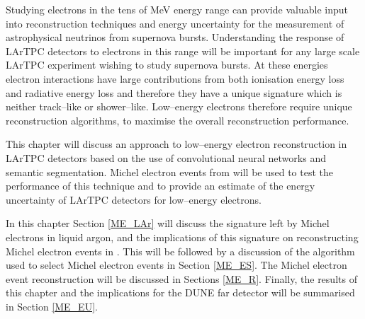 \minitoc

\noindent
Studying electrons in the tens of MeV energy range can provide valuable input 
into reconstruction techniques and energy uncertainty for the measurement of
astrophysical neutrinos from supernova bursts. Understanding the response of
LArTPC detectors to electrons in this range will be important for any large
scale LArTPC experiment wishing to study supernova bursts. At these energies
electron interactions have large contributions from both ionisation energy loss
and radiative energy loss and therefore they have a unique signature which is 
neither track--like or shower--like. Low--energy electrons therefore require 
unique reconstruction algorithms, to maximise the overall reconstruction 
performance. 

This chapter will discuss an approach to low--energy electron reconstruction 
in LArTPC detectors based on the use of convolutional neural networks and 
semantic segmentation. Michel electron events from \protodune{} will be used 
to test the performance of this technique and to provide an estimate of the 
energy uncertainty of LArTPC detectors for low--energy electrons.

In this chapter Section \ref{ME_LAr} will discuss the signature left by Michel
electrons in liquid argon, and the implications of this signature on
reconstructing Michel electron events in \protodune{}. This will be followed by
a discussion of the algorithm used to select Michel electron events in Section
\ref{ME_ES}. The Michel electron event reconstruction will be discussed in
Sections \ref{ME_R}. Finally, the results of this chapter and the implications
for the DUNE far detector will be summarised in Section \ref{ME_EU}.

